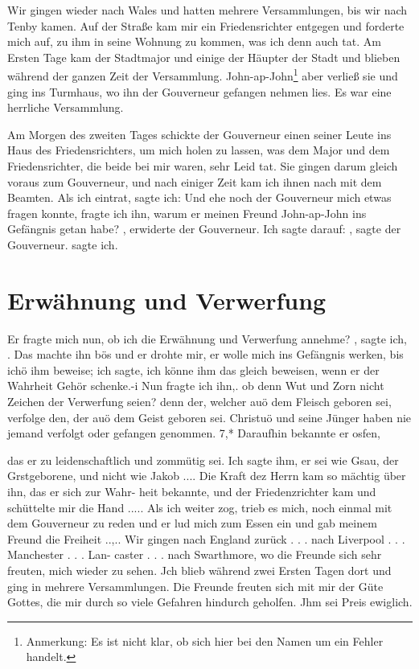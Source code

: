 Wir gingen wieder nach Wales und hatten mehrere 
Versammlungen, bis wir nach Tenby kamen. Auf der Straße kam
mir ein Friedensrichter entgegen und forderte mich auf, zu ihm
in seine Wohnung zu kommen, was ich denn auch tat. Am
Ersten Tage kam der Stadtmajor und einige der Häupter der
Stadt und blieben während der ganzen Zeit der Versammlung.
John-ap-John\footnote{Anmerkung: Es ist nicht klar, ob sich 
hier bei den Namen um ein Fehler handelt.} 
aber verließ sie und ging ins Turmhaus, wo ihn
der Gouverneur gefangen nehmen lies. Es war eine herrliche
Versammlung. 

Am Morgen des zweiten Tages schickte der 
Gouverneur einen seiner Leute ins Haus des Friedensrichters, um mich
holen zu lassen, was dem Major und dem Friedensrichter, die
beide bei mir waren, sehr Leid tat. Sie gingen darum gleich
voraus zum Gouverneur, und nach einiger Zeit kam ich ihnen nach
mit dem Beamten. Als ich eintrat, sagte ich:  Und ehe noch der Gouverneur mich etwas fragen konnte,
fragte ich ihn, warum er meinen Freund John-ap-John ins 
Gefängnis getan habe? , erwiderte der Gouverneur. 
Ich sagte darauf:  , sagte der Gouverneur.  sagte ich. 

\section{Erwähnung und Verwerfung}

Er fragte mich nun, ob ich die Erwähnung und Verwerfung annehme?
, sagte ich, . Das machte
ihn bös und er drohte mir, er wolle mich ins Gefängnis werken,
bis ichö ihm beweise; ich sagte, ich könne ihm das gleich beweisen,
wenn er der Wahrheit Gehör schenke.-i Nun fragte ich ihn,. ob denn
Wut und Zorn nicht Zeichen der Verwerfung seien? denn der,
welcher auö dem Fleisch geboren sei, verfolge den, der auö dem
Geist geboren sei. Christuö und seine Jünger haben nie jemand
verfolgt oder gefangen genommen. 7,* Daraufhin bekannte er osfen,


das er zu leidenschaftlich und zommütig sei. Ich sagte ihm, er
sei wie Gsau, der Grstgeborene, und nicht wie Jakob .... Die
Kraft dez Herrn kam so mächtig über ihn, das er sich zur Wahr-
heit bekannte, und der Friedenzrichter kam und schüttelte mir
die Hand ..... Als ich weiter zog, trieb es mich, noch einmal
mit dem Gouverneur zu reden und er lud mich zum Essen ein
und gab meinem Freund die Freiheit ..,.. Wir gingen nach
England zurück . . . nach Liverpool . . . Manchester . . . Lan-
caster . . . nach Swarthmore, wo die Freunde sich sehr freuten,
mich wieder zu sehen. Jch blieb während zwei Ersten Tagen
dort und ging in mehrere Versammlungen. Die Freunde freuten
sich mit mir der Güte Gottes, die mir durch so viele Gefahren
hindurch geholfen. Jhm sei Preis ewiglich.
